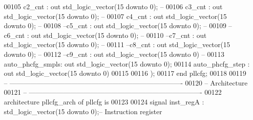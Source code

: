 \begin{DoxyCode}
00105       \textcolor{vhdlchar}{c2_cnt}         \textcolor{vhdlchar}{:} \textcolor{keywordflow}{out} \textcolor{comment}{std\_logic\_vector}\textcolor{vhdlchar}{(}\textcolor{vhdllogic}{}\textcolor{vhdllogic}{15} \textcolor{keywordflow}{downto} \textcolor{vhdllogic}{}\textcolor{vhdllogic}{0}\textcolor{vhdlchar}{)};\textcolor{keyword}{ -- }
00106       \textcolor{vhdlchar}{c3_cnt}         \textcolor{vhdlchar}{:} \textcolor{keywordflow}{out} \textcolor{comment}{std\_logic\_vector}\textcolor{vhdlchar}{(}\textcolor{vhdllogic}{}\textcolor{vhdllogic}{15} \textcolor{keywordflow}{downto} \textcolor{vhdllogic}{}\textcolor{vhdllogic}{0}\textcolor{vhdlchar}{)};\textcolor{keyword}{ -- }
00107       \textcolor{vhdlchar}{c4_cnt}         \textcolor{vhdlchar}{:} \textcolor{keywordflow}{out} \textcolor{comment}{std\_logic\_vector}\textcolor{vhdlchar}{(}\textcolor{vhdllogic}{}\textcolor{vhdllogic}{15} \textcolor{keywordflow}{downto} \textcolor{vhdllogic}{}\textcolor{vhdllogic}{0}\textcolor{vhdlchar}{)};\textcolor{keyword}{ -- }
00108 \textcolor{keyword}{      --c5\_cnt       : out std\_logic\_vector(15 downto 0); -- }
00109 \textcolor{keyword}{      --c6\_cnt       : out std\_logic\_vector(15 downto 0); -- }
00110 \textcolor{keyword}{      --c7\_cnt       : out std\_logic\_vector(15 downto 0); -- }
00111 \textcolor{keyword}{      --c8\_cnt       : out std\_logic\_vector(15 downto 0); -- }
00112 \textcolor{keyword}{      --c9\_cnt       : out std\_logic\_vector(15 downto 0) --}
00113       \textcolor{vhdlchar}{auto_phcfg_smpls}\textcolor{vhdlchar}{:} \textcolor{keywordflow}{out} \textcolor{comment}{std\_logic\_vector}\textcolor{vhdlchar}{(}\textcolor{vhdllogic}{}\textcolor{vhdllogic}{15} \textcolor{keywordflow}{downto} \textcolor{vhdllogic}{}\textcolor{vhdllogic}{0}\textcolor{vhdlchar}{)};
00114       \textcolor{vhdlchar}{auto_phcfg_step}   \textcolor{vhdlchar}{:} \textcolor{keywordflow}{out} \textcolor{comment}{std\_logic\_vector}\textcolor{vhdlchar}{(}\textcolor{vhdllogic}{}\textcolor{vhdllogic}{15} \textcolor{keywordflow}{downto} \textcolor{vhdllogic}{}\textcolor{vhdllogic}{0}\textcolor{vhdlchar}{)}
00115 
00116 \textcolor{vhdlchar}{)};
00117 \textcolor{keywordflow}{end} \textcolor{vhdlchar}{pllcfg};
00118 
00119 \textcolor{keyword}{-- ----------------------------------------------------------------------------}
00120 \textcolor{keyword}{-- Architecture}
00121 \textcolor{keyword}{-- ----------------------------------------------------------------------------}
00122 \textcolor{keywordflow}{architecture} pllcfg\_arch \textcolor{keywordflow}{of} pllcfg is
00123 
00124 \textcolor{keywordflow}{signal} \textcolor{vhdlchar}{inst_regA}     \textcolor{vhdlchar}{:} \textcolor{comment}{std\_logic\_vector}\textcolor{vhdlchar}{(}\textcolor{vhdllogic}{}\textcolor{vhdllogic}{15} \textcolor{keywordflow}{downto} \textcolor{vhdllogic}{}\textcolor{vhdllogic}{0}\textcolor{vhdlchar}{)};\textcolor{keyword}{-- Instruction register}

\end{DoxyCode}
